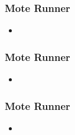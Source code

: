 \documentclass[12pt, compress]{beamer}
\begin{document}
\begin{frame}[fragile]
  \frametitle{Mote Runner}
  \begin{itemize}
  	\item 
  \end{itemize}
\end{frame}

\begin{frame}[fragile]
  \frametitle{Mote Runner}
  \begin{itemize}
  	\item 
  \end{itemize}
\end{frame}

\begin{frame}[fragile]
  \frametitle{Mote Runner}
  \begin{itemize}
  	\item 
  \end{itemize}
\end{frame}
\end{document}
